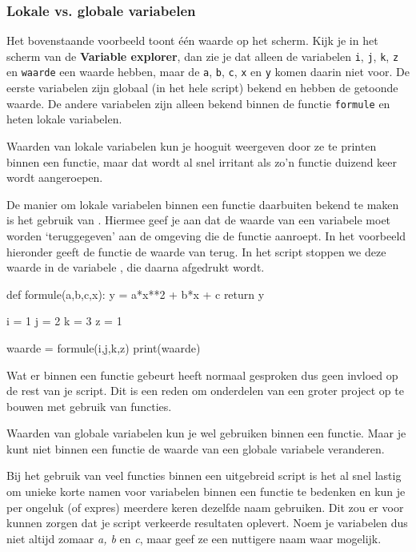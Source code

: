 \documentclass[a4paper,11pt, fleqn]{article}
\begin{document}
\subsubsection{Lokale vs. globale variabelen}
Het bovenstaande voorbeeld toont \'e\'en waarde op het scherm. Kijk je in het scherm van de \textbf{Variable explorer}, dan zie je dat alleen de variabelen \verb.i., \verb.j., \verb.k., \verb.z. en \verb.waarde. een waarde hebben, maar de \verb.a., \verb.b., \verb.c., \verb.x. en \verb.y. komen daarin niet voor.
De eerste variabelen zijn globaal (in het hele script) bekend en hebben de getoonde waarde. De andere variabelen zijn alleen bekend binnen de functie \verb.formule. en heten lokale variabelen. 

Waarden van lokale variabelen kun je hooguit weergeven door ze te printen binnen een functie, maar dat wordt al snel irritant als zo'n functie duizend keer wordt aangeroepen. 

De manier om lokale variabelen binnen een functie daarbuiten bekend te maken is het gebruik van . Hiermee geef je aan dat de waarde van een variabele moet worden `teruggegeven' aan de omgeving die de functie aanroept. In het voorbeeld hieronder geeft de functie  de waarde van  terug. In het script stoppen we deze waarde in de variabele , die daarna afgedrukt wordt.

\begin{python}
def formule(a,b,c,x):
    y = a*x**2 + b*x + c
    return y

i = 1
j = 2
k = 3
z = 1

waarde = formule(i,j,k,z)
print(waarde)
\end{python}

Wat er binnen een functie gebeurt heeft normaal gesproken dus geen invloed op de rest van je script. Dit is een reden om onderdelen van een groter project op te bouwen met gebruik van functies.

Waarden van globale variabelen kun je wel gebruiken binnen een functie. Maar je kunt niet binnen een functie de waarde van een globale variabele veranderen.

Bij het gebruik van veel functies binnen een uitgebreid script is het al snel lastig om unieke korte namen voor variabelen binnen een functie te bedenken en kun je per ongeluk (of expres) meerdere keren dezelfde naam gebruiken. Dit zou er voor kunnen zorgen dat je script verkeerde resultaten oplevert. Noem je variabelen dus niet altijd zomaar \textit{a, b} en \textit{c}, maar geef ze een nuttigere naam waar mogelijk.
\end{document}
